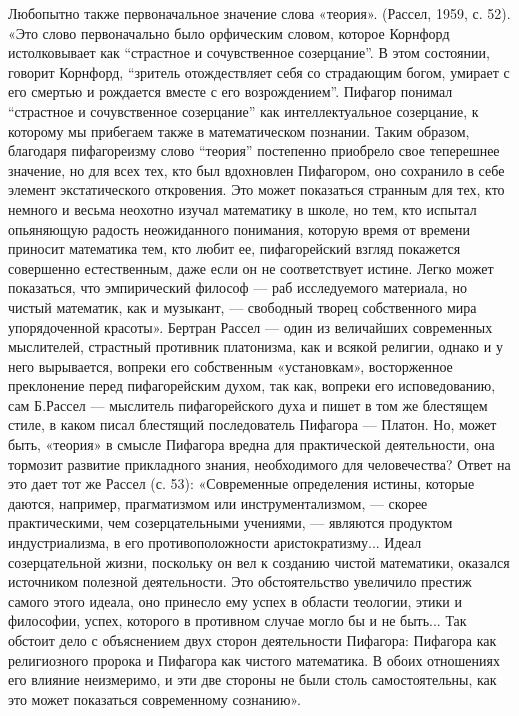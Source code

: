 Любопытно также первоначальное значение слова «теория». (Рассел,
1959, с. 52). «Это слово первоначально было орфическим словом, которое
Корнфорд истолковывает как ``страстное и сочувственное созерцание''. В
этом состоянии, говорит Корнфорд, ``зритель отождествляет себя со
страдающим богом, умирает с его смертью и рождается вместе с его
возрождением''. Пифагор понимал ``страстное и сочувственное
созерцание'' как интеллектуальное созерцание, к которому мы прибегаем
также в математическом познании. Таким образом, благодаря пифагореизму
слово ``теория'' постепенно приобрело свое теперешнее значение, но для
всех тех, кто был вдохновлен Пифагором, оно сохранило в себе элемент
экстатического откровения. Это может показаться странным для тех, кто
немного и весьма неохотно изучал математику в школе, но тем, кто
испытал опьяняющую радость неожиданного понимания, которую время от
времени приносит математика тем, кто любит ее, пифагорейский взгляд
покажется совершенно естественным, даже если он не соответствует
истине. Легко может показаться, что эмпирический философ --- раб
исследуемого материала, но чистый математик, как и музыкант, ---
свободный творец собственного мира упорядоченной красоты». Бертран
Рассел --- один из величайших современных мыслителей, страстный
противник платонизма, как и всякой религии, однако и у него
вырывается, вопреки его собственным «установкам», восторженное
преклонение перед пифагорейским духом, так как, вопреки его
исповедованию, сам Б.Рассел --- мыслитель пифагорейского духа и пишет
в том же блестящем стиле, в каком писал блестящий последователь
Пифагора --- Платон. Но, может быть, «теория» в смысле Пифагора вредна
для практической деятельности, она тормозит развитие прикладного
знания, необходимого для человечества? Ответ на это дает тот же Рассел
(с. 53): «Современные определения истины, которые даются, например,
прагматизмом или инструментализмом, --- скорее практическими, чем
созерцательными учениями, --- являются продуктом индустриализма, в его
противоположности аристократизму... Идеал созерцательной жизни,
поскольку он вел к созданию чистой математики, оказался источником
полезной деятельности. Это обстоятельство увеличило престиж самого
этого идеала, оно принесло ему успех в области теологии, этики и
философии, успех, которого в противном случае могло бы и не быть...
Так обстоит дело с объяснением двух сторон деятельности Пифагора:
Пифагора как религиозного пророка и Пифагора как чистого математика. В
обоих отношениях его влияние неизмеримо, и эти две стороны не были
столь самостоятельны, как это может показаться современному сознанию».

